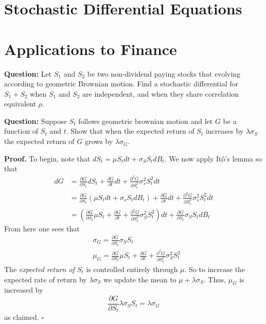 \documentclass{article}
\begin{document}
\newpage
\section{Stochastic Differential Equations}


\newpage
\section{Applications to Finance}

\begin{tcolorbox}[colframe=black,colback=gray!5,boxrule=0.5pt]
\textbf{Question:} Let $S_1$ and $S_2$ be two non-dividend paying stocks that evolving according to geometric Brownian motion. Find a stochastic differential for $S_1 + S_2$ when $S_1$ and $S_2$ are independent, and when they share correlation equivalent $\rho$.  \cite{Hull}
\end{tcolorbox}


\begin{tcolorbox}[colframe=black,colback=gray!5,boxrule=0.5pt]
\textbf{Question:} Suppose $S_t$ follows geometric brownian motion and let $G$ be a function of $S_t$ and $t$. Show that when the expected return of $S_t$ increases by $\lambda \sigma _S$ the expected return of $G$ grows by $\lambda \sigma _G$. \cite{Hull}
\end{tcolorbox}
\textbf{Proof.} To begin, note that $dS_t = \mu S_t dt + \sigma_S S_tdB_t$. We now apply Itô's lemma so that 
\begin{align*}
   dG &= \frac{\partial G}{\partial S_t}dS_t + \frac{\partial G}{\partial t}dt + \frac{\partial^2 G}{\partial S_t^2}\sigma^2_s S_t^2dt  \\
   &= \frac{\partial G}{\partial S_t}(\mu S_t dt + \sigma_sS_tdB_t) + \frac{\partial G}{\partial t}dt + \frac{\partial^2 G}{\partial S_t^2}\sigma^2_s S_t^2dt \\
   &= \left(\frac{\partial G}{\partial S_t}\mu S_t + \frac{\partial G}{\partial t} + \frac{\partial^2 G}{\partial S_t^2}\sigma_S^2S_t^2\right)dt + \frac{\partial G}{\partial S_t}\sigma_S S_t dB_t
\end{align*}
From here one sees that 
\begin{align*}
     & \sigma_G = \frac{\partial G}{\partial S_t}\sigma_S S_t \\
    & \mu_G  = \frac{\partial G}{\partial S_t}\mu S_t + \frac{\partial G}{\partial t} + \frac{\partial^2 G}{\partial S_t^2}\sigma_S^2S_t^2
\end{align*}
The \textit{expected return of $S_t$} is controlled entirely through $\mu$. So to increase the expected rate of return by $\lambda\sigma_S$ we update the mean to $\mu + \lambda\sigma_S$. Thus, $\mu_G$ is increased by
$$\frac{\partial G}{\partial S_t}\lambda\sigma_S S_t = \lambda\sigma_G$$
as claimed. $\square$
 
\end{document}
